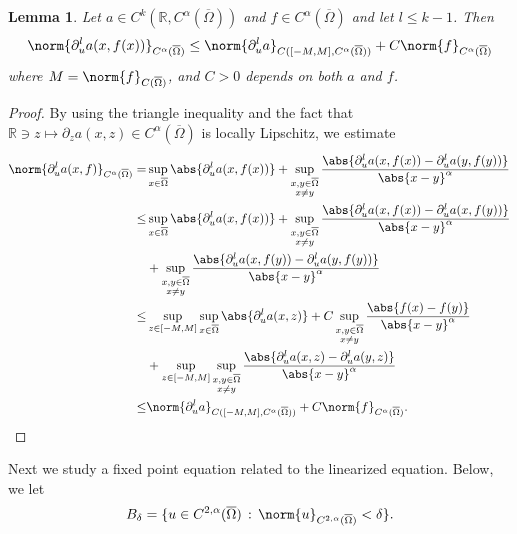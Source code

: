 \documentclass[11pt,a4paper]{amsart}
\newtheorem{Lemma}[Theorem]{Lemma}
\theoremstyle{definition}
\numberwithin{equation}{section}
\newcommand{\mR}{\mathbb{R}}                    %
\newcommand{\ol}[1]{\overline{#1}}
\newcommand{\Om}{\Omega}
\begin{document}
\begin{Lemma}\label{lemma_a_boundedness}
	Let \( a\in C^{k}(\mR, C^{\alpha}(\ol\Om)) \) and \( f\in C^{\alpha}(\ol{\Omega}) \) and let \( l\leq k-1 \). Then
	\begin{equation}\label{eq_a_boundedness}
		\norm{\partial_{u}^{l}a(x,f(x))}_{C^{\alpha}(\ol{\Omega})} \leq \norm{\partial_{u}^{l}a}_{C([-M,M], C^{\alpha}(\overline{\Omega}))} + C\norm{f}_{C^{\alpha}(\overline{\Omega})}
	\end{equation}
	where \( M = \norm{f}_{C(\ol{\Omega})} \), and $C>0$ depends on both $a$ and $f$.
\end{Lemma}
\begin{proof}
By using the triangle inequality and the fact that \( \mathbb{R}\ni z \mapsto\partial_{z}a(x,z)\in C^{\alpha}(\overline{\Omega}) \) is locally Lipschitz, we estimate
\begin{align*}
	 \norm{\partial_{u}^{l}a(x,f)}_{C^{\alpha}(\ol{\Omega})} = &\sup_{x\in\ol{\Omega}} \abs{\partial_{u}^{l}a(x,f(x))} + \sup_{\substack{x,y\in\ol{\Omega}\\x\neq y}}\frac{\abs{\partial_{u}^{l}a(x,f(x)) - \partial_{u}^{l}a(y,f(y))}}{\abs{x-y}^{\alpha}} \\
	 \leq&\sup_{x\in\ol{\Omega}} \abs{\partial_{u}^{l}a(x,f(x))} + \sup_{\substack{x,y\in\ol{\Omega}\\x\neq y}}\frac{\abs{\partial_{u}^{l}a(x,f(x)) - \partial_{u}^{l}a(x,f(y))}}{\abs{x-y}^{\alpha}} \\
	 &+\sup_{\substack{x,y\in\ol{\Omega}\\x\neq y}}\frac{\abs{\partial_{u}^{l}a(x,f(y)) - \partial_{u}^{l}a(y,f(y))}}{\abs{x-y}^{\alpha}} \\
	 \leq&\sup_{z\in[-M,M]}\sup_{x\in\ol{\Omega}} \abs{\partial_{u}^{l}a(x,z)} + C\sup_{\substack{x,y\in\ol{\Omega}\\x\neq y}}\frac{\abs{f(x) - f(y)}}{\abs{x-y}^{\alpha}} \\
	 &+\sup_{z\in[-M,M]}\sup_{\substack{x,y\in\ol{\Omega}\\x\neq y}}\frac{\abs{\partial_{u}^{l}a(x,z) - \partial_{u}^{l}a(y,z)}}{\abs{x-y}^{\alpha}} \\
	 \leq&\norm{\partial_{u}^{l}a}_{C([-M,M], C^{\alpha}(\overline{\Omega}))} + C\norm{f}_{C^{\alpha}(\overline{\Omega})}.\qedhere
\end{align*}
\end{proof}


Next we study a fixed point equation related to the linearized equation. Below, we let 
\begin{equation} \label{bdelta_def}
B_{\delta} = \{ u \in C^{2,\alpha}(\ol{\Omega}) \,:\, \norm{u}_{C^{2,\alpha}(\ol{\Om})} < \delta \}.
\end{equation}
\end{document}
